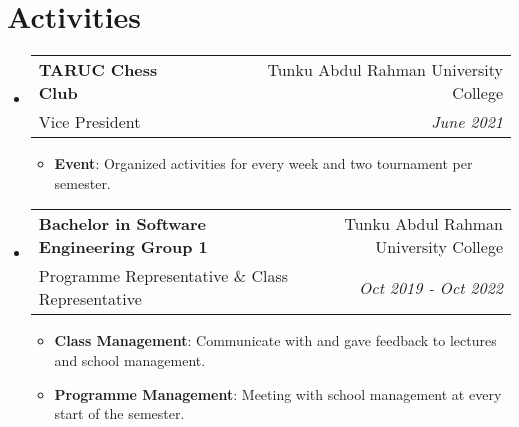 \documentclass[a4paper, 12pt]{article}
\makeatletter
\newcommand{\resumeItem}[2]{
  \item\small{
    \textbf{\textsf{#1}}{: \textsf{#2} \vspace{-2pt}}
  }
}
\newcommand{\resumeSubheading}[4]{
  \vspace{-1pt}\item
    \begin{tabular*}{0.97\textwidth}[t]{l@{\extracolsep{\fill}}r}
      \textbf{\textsf{#1}} & \textsf{#2} \\
      \textsf{\small{#3}} & \textit{\textsf{\small{#4}}} \\
    \end{tabular*}\vspace{-5pt}
}
\newcommand{\resumeSubHeadingListStart}{\begin{itemize}[leftmargin=*]}
\newcommand{\resumeSubHeadingListEnd}{\end{itemize}}
\newcommand{\resumeItemListStart}{\begin{itemize}}
\newcommand{\resumeItemListEnd}{\end{itemize}\vspace{-5pt}}
\makeatother
\begin{document}
\section{Activities}
    \resumeSubHeadingListStart
        \resumeSubheading
        {TARUC Chess Club}{Tunku Abdul Rahman University College}
        {Vice President}{June 2021}
            \resumeItemListStart
                \resumeItem{Event}
                {Organized activities for every week and two tournament per semester.}
            \resumeItemListEnd
    
    \vspace{5px}
    \resumeSubheading
        {Bachelor in Software Engineering Group 1}{Tunku Abdul Rahman University College}
        {Programme Representative \& Class Representative}{Oct 2019 - Oct 2022}
            \resumeItemListStart
                \resumeItem{Class Management}
                {Communicate with and gave feedback to lectures and school management.}
                \resumeItem{Programme Management}
                {Meeting with school management at every start of the semester.}
            \resumeItemListEnd
\resumeSubHeadingListEnd
\end{document}
